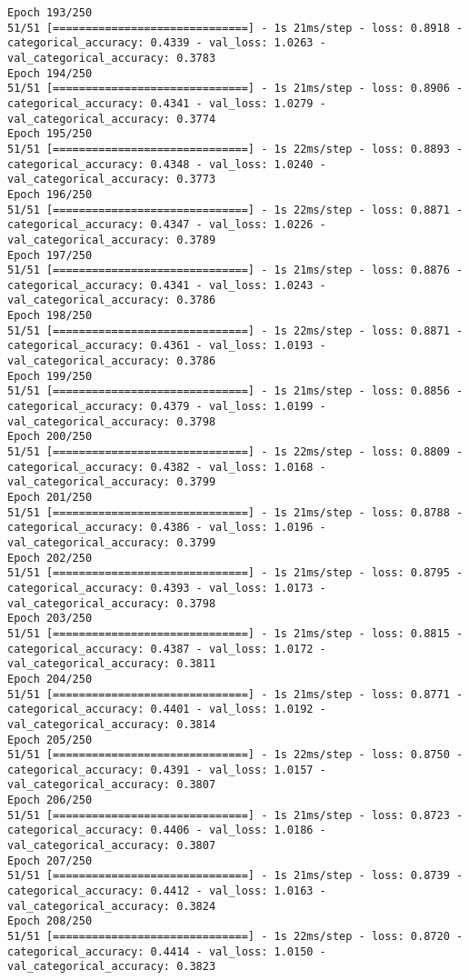 \begin{lstlisting}
Epoch 193/250
51/51 [==============================] - 1s 21ms/step - loss: 0.8918 - categorical_accuracy: 0.4339 - val_loss: 1.0263 - val_categorical_accuracy: 0.3783
Epoch 194/250
51/51 [==============================] - 1s 21ms/step - loss: 0.8906 - categorical_accuracy: 0.4341 - val_loss: 1.0279 - val_categorical_accuracy: 0.3774
Epoch 195/250
51/51 [==============================] - 1s 22ms/step - loss: 0.8893 - categorical_accuracy: 0.4348 - val_loss: 1.0240 - val_categorical_accuracy: 0.3773
Epoch 196/250
51/51 [==============================] - 1s 22ms/step - loss: 0.8871 - categorical_accuracy: 0.4347 - val_loss: 1.0226 - val_categorical_accuracy: 0.3789
Epoch 197/250
51/51 [==============================] - 1s 21ms/step - loss: 0.8876 - categorical_accuracy: 0.4341 - val_loss: 1.0243 - val_categorical_accuracy: 0.3786
Epoch 198/250
51/51 [==============================] - 1s 22ms/step - loss: 0.8871 - categorical_accuracy: 0.4361 - val_loss: 1.0193 - val_categorical_accuracy: 0.3786
Epoch 199/250
51/51 [==============================] - 1s 21ms/step - loss: 0.8856 - categorical_accuracy: 0.4379 - val_loss: 1.0199 - val_categorical_accuracy: 0.3798
Epoch 200/250
51/51 [==============================] - 1s 22ms/step - loss: 0.8809 - categorical_accuracy: 0.4382 - val_loss: 1.0168 - val_categorical_accuracy: 0.3799
Epoch 201/250
51/51 [==============================] - 1s 21ms/step - loss: 0.8788 - categorical_accuracy: 0.4386 - val_loss: 1.0196 - val_categorical_accuracy: 0.3799
Epoch 202/250
51/51 [==============================] - 1s 21ms/step - loss: 0.8795 - categorical_accuracy: 0.4393 - val_loss: 1.0173 - val_categorical_accuracy: 0.3798
Epoch 203/250
51/51 [==============================] - 1s 21ms/step - loss: 0.8815 - categorical_accuracy: 0.4387 - val_loss: 1.0172 - val_categorical_accuracy: 0.3811
Epoch 204/250
51/51 [==============================] - 1s 21ms/step - loss: 0.8771 - categorical_accuracy: 0.4401 - val_loss: 1.0192 - val_categorical_accuracy: 0.3814
Epoch 205/250
51/51 [==============================] - 1s 22ms/step - loss: 0.8750 - categorical_accuracy: 0.4391 - val_loss: 1.0157 - val_categorical_accuracy: 0.3807
Epoch 206/250
51/51 [==============================] - 1s 21ms/step - loss: 0.8723 - categorical_accuracy: 0.4406 - val_loss: 1.0186 - val_categorical_accuracy: 0.3807
Epoch 207/250
51/51 [==============================] - 1s 21ms/step - loss: 0.8739 - categorical_accuracy: 0.4412 - val_loss: 1.0163 - val_categorical_accuracy: 0.3824
Epoch 208/250
51/51 [==============================] - 1s 22ms/step - loss: 0.8720 - categorical_accuracy: 0.4414 - val_loss: 1.0150 - val_categorical_accuracy: 0.3823

\end{lstlisting}
